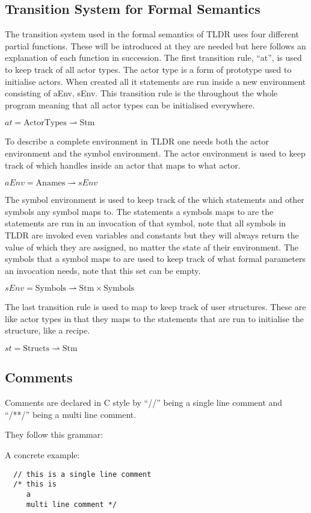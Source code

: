 \subsection{Transition System for Formal Semantics}
The transition system used in the formal semantics of TLDR uses four different partial functions. These will be introduced at they are needed but here follows an explanation of each function in succession.
The first transition rule, \enquote{at}, is used to keep track of all actor types. The actor type is a form of prototype used to initialise actors. When created all it statements are run inside a new environment consisting of aEnv, sEnv. This transition rule is the throughout the whole program meaning that all actor types can be initialised everywhere.
\begin{center}
$at = \text{ActorTypes} \rightharpoonup \text{Stm}$
\end{center}
To describe a complete environment in TLDR one needs both the actor environment and the symbol environment. The actor environment is used to keep track of which handles inside an actor that maps to what actor.
\begin{center}
$aEnv = \text{Anames} \rightharpoonup sEnv$
\end{center}
The symbol environment is used to keep track of the which statements and other symbols any symbol maps to. The statements a symbols maps to are the statements are run in an invocation of that symbol, note that all symbols in TLDR are invoked even variables and constants but they will always return the value of which they are assigned, no matter the state af their environment. The symbols that a symbol maps to are used to keep track of what formal parameters an invocation needs, note that this set can be empty.
\begin{center}
$sEnv = \text{Symbols} \rightharpoonup \text{Stm} \times \text{Symbols}$
\end{center}
The last transition rule is used to map to keep track of user structures. These are like actor types in that they maps to the statements that are run to initialise the structure, like a recipe.
\begin{center}
$st = \text{Structs} \rightharpoonup \text{Stm}$
\end{center}

\subsection{Comments}
\label{subsec:comments}

Comments are declared in C style by \enquote{//} being a single line comment and \enquote{/**/} being a multi line comment.

They follow this grammar:


A concrete example:

\begin{verbatim}
  // this is a single line comment
  /* this is
     a
     multi line comment */
\end{verbatim}
